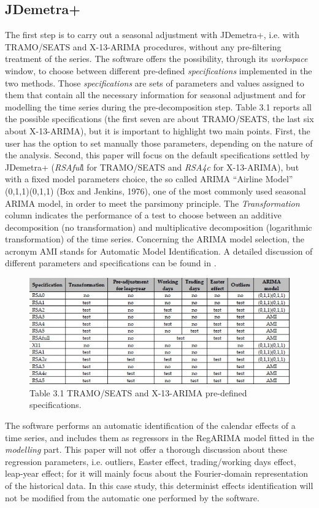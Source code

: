 \documentclass[english,blauw]{cbsdiscussionpaper}
\begin{document}
\subsection{JDemetra+}
The first step is to carry out a seasonal adjustment with JDemetra+, i.e. with TRAMO/SEATS and X-13-ARIMA procedures, without any pre-filtering treatment of the series. The software offers the possibility, through its \textit{workspace} window, to choose between different pre-defined \textit{specifications} implemented in the two methods. Those \textit{specifications} are sets of parameters and values assigned to them that contain all the necessary information for seasonal adjustment and for modelling the time series during the pre-decomposition step. Table 3.1 reports all the possible specifications (the first seven are about TRAMO/SEATS, the last six about X-13-ARIMA), but it is important to highlight two main points. First, the user has the option to set manually those parameters, depending on the nature of the analysis. Second, this paper will focus on the default specifications settled by JDemetra+ (\textit{RSAful}l for TRAMO/SEATS and \textit{RSA4c} for X-13-ARIMA), but with a fixed model parameters choice, the so called ARIMA ``Airline Model'' (0,1,1)(0,1,1) (Box and Jenkins, 1976), one of the most commonly used seasonal ARIMA model, in order to meet the parsimony principle. The \textit{Transformation} column indicates the performance of a test to choose between an additive decomposition (no transformation) and multiplicative decomposition (logarithmic transformation) of the time series. Concerning the ARIMA model selection, the acronym AMI stands for Automatic Model Identification. A detailed discussion of different parameters and specifications can be found in \citep{gru2015}.
\begin{figure}[h]
\includegraphics[width=\linewidth]{../images/capitolo3/specification.jpg}
\caption*{Table 3.1 \quad TRAMO/SEATS and X-13-ARIMA pre-defined specifications.}
\label{fig:specification}
\end{figure}
The software performs an automatic identification of the calendar effects of a time series, and includes them as regressors in the RegARIMA model fitted in the \textit{modelling} part. This paper will not offer a thorough discussion about these regression parameters, i.e. outliers, Easter effect, trading/working days effect, leap-year effect; for it will mainly focus about the Fourier-domain representation of the historical data. In this case study, this determinist effects identification will not be modified from the automatic one performed by the software.
\end{document}
